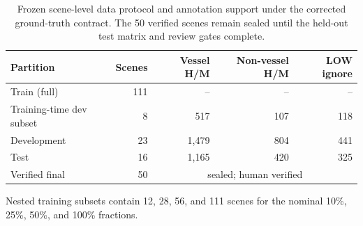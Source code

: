 \begin{table}[t]
\caption{Frozen scene-level data protocol and annotation support under the
corrected ground-truth contract. The 50 verified scenes remain sealed until
the held-out test matrix and review gates complete.}
\label{tab:data-protocol}
\centering
\small
\setlength{\tabcolsep}{7pt}
\begin{tabular}{@{}lrrrr@{}}
\toprule
Partition & Scenes & Vessel H/M & Non-vessel H/M & LOW ignore \\
\midrule
Train (full) & 111 & -- & -- & -- \\
Training-time dev subset & 8 & 517 & 107 & 118 \\
Development & 23 & 1,479 & 804 & 441 \\
Test & 16 & 1,165 & 420 & 325 \\
Verified final & 50 & \multicolumn{3}{c}{sealed; human verified} \\
\bottomrule
\end{tabular}
\vspace{2pt}
\parbox{\textwidth}{\small Nested training subsets contain 12, 28, 56, and
111 scenes for the nominal 10\%, 25\%, 50\%, and 100\% fractions.}
\end{table}
